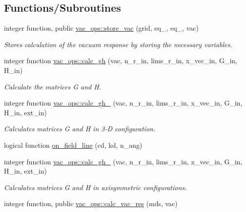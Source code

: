 \subsection*{Functions/\+Subroutines}
\begin{DoxyCompactItemize}
\item 
integer function, public \hyperlink{namespacevac__ops_a37220702fbf378626a0f2c12f446e0aa}{vac\+\_\+ops\+::store\+\_\+vac} (grid, eq\+\_, eq\+\_, vac)
\begin{DoxyCompactList}\small\item\em Stores calculation of the vacuum response by storing the necessary variables. \end{DoxyCompactList}\item 
integer function \hyperlink{namespacevac__ops_a7e3f92fbe9fa6cf3de6ac301676b96d1}{vac\+\_\+ops\+::calc\+\_\+gh} (vac, n\+\_\+r\+\_\+in, lims\+\_\+r\+\_\+in, x\+\_\+vec\+\_\+in, G\+\_\+in, H\+\_\+in)
\begin{DoxyCompactList}\small\item\em Calculate the matrices {\ttfamily G} and {\ttfamily H}. \end{DoxyCompactList}\item 
integer function \hyperlink{namespacevac__ops_a267742c3c9a1b395aee76527d1e8352c}{vac\+\_\+ops\+::calc\+\_\+gh\+\_} (vac, n\+\_\+r\+\_\+in, lims\+\_\+r\+\_\+in, x\+\_\+vec\+\_\+in, G\+\_\+in, H\+\_\+in, ext\+\_\+in)
\begin{DoxyCompactList}\small\item\em Calculates matrices {\ttfamily G} and {\ttfamily H} in 3-\/D configuration. \end{DoxyCompactList}\item 
logical function \hyperlink{vac__ops_8f90_a3d8bbdba782171b063ad415370c8be48}{on\+\_\+field\+\_\+line} (cd, kd, n\+\_\+ang)
\item 
integer function \hyperlink{namespacevac__ops_ae4987d1f48f1f83b1f0d38ea85b4998b}{vac\+\_\+ops\+::calc\+\_\+gh\+\_} (vac, n\+\_\+r\+\_\+in, lims\+\_\+r\+\_\+in, x\+\_\+vec\+\_\+in, G\+\_\+in, H\+\_\+in, ext\+\_\+in)
\begin{DoxyCompactList}\small\item\em Calculates matrices {\ttfamily G} and {\ttfamily H} in axisymmetric configurations. \end{DoxyCompactList}\item 
integer function, public \hyperlink{namespacevac__ops_a5e5a8322b3aa2e3704b1050426f06d9d}{vac\+\_\+ops\+::calc\+\_\+vac\+\_\+res} (mds, vac)

\end{DoxyCompactItemize}
